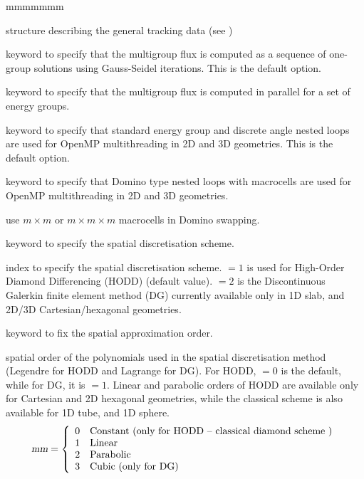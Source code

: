 \begin{ListeDeDescription}{mmmmmmm}

\item[\dstr{desctrack}] structure describing the general tracking data (see
)

\item[\moc{ONEG}] keyword to specify that the multigroup flux is computed as a sequence of one-group solutions using Gauss-Seidel iterations. This is the default option.

\item[\moc{ALLG}] keyword to specify that the multigroup flux is computed in parallel for a set of energy groups.

\item[\moc{DOFF}] keyword to specify that standard energy group and discrete angle nested loops are used for OpenMP
multithreading in 2D and 3D geometries. This is the default option.

\item[\moc{DOON}] keyword to specify that Domino type nested loops with macrocells are used for OpenMP multithreading in 2D and 3D geometries.\cite{domino}

\item[\dusa{m}] use $m\times m$ or $m \times m \times m$ macrocells in Domino swapping.

\item[\moc{SCHM}] keyword to specify the spatial discretisation scheme. 

\item[\dusa{ischm}] index to specify the spatial discretisation scheme.  $=1$ is used for High-Order Diamond Differencing (HODD) (default value).  $=2$ is the Discontinuous Galerkin finite element method (DG) currently available only in 1D slab, and 2D/3D Cartesian/hexagonal geometries.

\item[\moc{DIAM}] keyword to fix the spatial approximation order.

\item[\dusa{mm}] spatial order of the polynomials used in the spatial discretisation method (Legendre for HODD and Lagrange for DG). For HODD,  $=0$ is the default, while for DG, it is  $=1$. Linear and parabolic orders of HODD are available only for Cartesian and 2D hexagonal geometries, while the classical scheme is also available for 1D tube, and 1D sphere.
\begin{displaymath}
\dusa{mm} = \left\{
\begin{array}{rl}
 0 & \textrm{Constant (only for HODD -- classical diamond scheme )} \\
 1 & \textrm{Linear} \\
 2 & \textrm{Parabolic} \\
 3 & \textrm{Cubic (only for DG)}
\end{array} \right.
\end{displaymath}


\end{ListeDeDescription}
